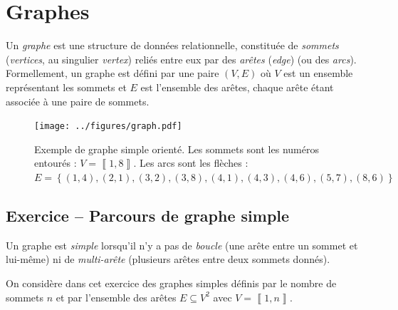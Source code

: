 \documentclass{article}
\newcounter{loop}
\newcounter{numEx}
\newcommand{\exo}[1]{
	\stepcounter{numEx}
	\setcounter{loop}{0}
	\subsection*{Exercice \arabic{numEx} -- #1}
}
\newcommand{\llbra}{\left\llbracket}
\newcommand{\rrbra}{\right\rrbracket}
\renewcommand{\brack}[1]{\ensuremath{\llbra#1\rrbra}}
\begin{document}
%
%
%

\section{Graphes}

Un \emph{graphe} est une structure de données relationnelle, constituée de \emph{sommets} (\textit{vertices}, au singulier \textit{vertex}) reliés entre eux par des \emph{arêtes} (\textit{edge}) (ou des \emph{arcs}). Formellement, un graphe est défini par une paire $(V, E)$ où $V$ est un ensemble représentant les sommets et $E$ est l'ensemble des arêtes, chaque arête étant associée à une paire de sommets.

\begin{figure}[bh]
	\centering
	\texttt{[image: ../figures/graph.pdf]}
	\caption{Exemple de graphe simple orienté. Les sommets sont les numéros entourés : $V = \brack{1,8}$. Les arcs sont les flèches : $E = \left\{(1,4), (2, 1), (3, 2), (3, 8), (4, 1), (4, 3), (4, 6), (5, 7), (8, 6)\right\}$}\label{fig:example_graph}
\end{figure}

\exo{Parcours de graphe simple}

Un graphe est \emph{simple} lorsqu'il n'y a pas de \emph{boucle} (une arête entre un sommet et lui-même) ni de \emph{multi-arête} (plusieurs arêtes entre deux sommets donnés).

On considère dans cet exercice des graphes simples définis par le nombre de sommets $n$ et par l'ensemble des arêtes $E\subseteq V^2$ avec $V = \brack{1,n}$.
\end{document}
